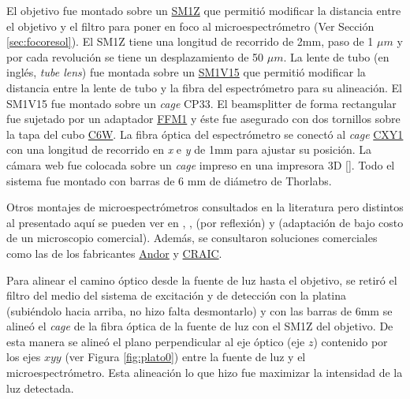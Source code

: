 El objetivo fue montado sobre un \href{https://www.thorlabs.com/thorProduct.cfm?partNumber=SM1Z\#ad-image-0}{SM1Z} que permitió modificar la distancia entre el objetivo y el filtro para poner en foco al microespectrómetro (Ver Sección \ref{sec:focoresol}). El SM1Z tiene una longitud de recorrido de 2mm, paso de 1 $\mu m$ y por cada revolución se tiene un desplazamiento de 50 $\mu m$.  La lente de tubo (en inglés, \textit{tube lens}) fue montada sobre un \href{https://www.thorlabs.com/thorproduct.cfm?partnumber=SM1V15}{SM1V15} que permitió modificar la distancia entre la lente de tubo y la fibra del espectrómetro para su alineación. El SM1V15 fue montado sobre un \textit{cage} CP33. El beamsplitter de forma rectangular fue sujetado por un adaptador \href{https://www.thorlabs.com/thorproduct.cfm?partnumber=FFM1\#ad-image-0}{FFM1} y éste fue asegurado con dos tornillos sobre la tapa del cubo \href{https://www.thorlabs.com/thorproduct.cfm?partnumber=C6W}{C6W}. La fibra óptica del espectrómetro se conectó al \textit{cage} \href{https://www.thorlabs.com/thorproduct.cfm?partnumber=CXY1\#ad-image-0}{CXY1} con una longitud de recorrido en \textit{x} e \textit{y} de 1mm para ajustar su posición. La cámara web fue colocada sobre un \textit{cage} impreso en una impresora 3D [\href{https://github.com/jrr1984/open_frame_XYStage/blob/master/3dprintedparts/STLs/CAGE\_1pulgada.STL}{\faCubes}]. Todo el sistema fue montado con barras de 6 mm de diámetro de Thorlabs.

Otros montajes de microespectrómetros consultados en la literatura pero distintos al presentado aquí se pueden ver en \cite{frosch}, \cite{wong}, \cite{mour}(por reflexión) y \cite{frise} (adaptación de bajo costo de un microscopio comercial). Además, se consultaron soluciones comerciales como las de los fabricantes \href{https://andor.oxinst.com/learning/view/article/modular-solutions-for-microspectroscopy}{Andor} y \href{http://www.microspectra.com/}{CRAIC}.

Para alinear el camino óptico desde la fuente de luz hasta el objetivo, se retiró el filtro del medio del sistema de excitación y de detección con la platina (subiéndolo hacia arriba, no hizo falta desmontarlo) y con las barras de 6mm se alineó el \textit{cage} de la fibra óptica de la fuente de luz con el SM1Z del objetivo. De esta manera se alineó el plano perpendicular al eje óptico (eje $\textit{z}$) contenido por los ejes $\textit{x} y \textit{y}$ (ver Figura \ref{fig:plato0}) entre la fuente de luz y el microespectrómetro. Esta alineación lo que hizo fue maximizar la intensidad de la luz detectada.

